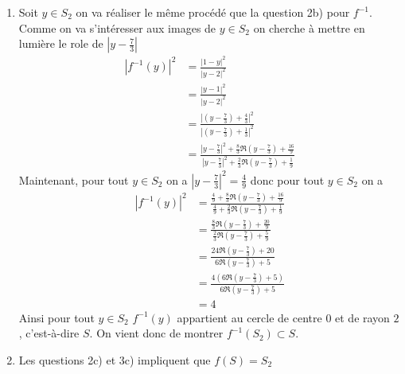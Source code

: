 \begin{correction}
\begin{enumerate}
\begin{enumerate}
\item Soit $y\in S_2$ on va réaliser le même procédé que la question 2b) pour $f^{-1}$. Comme on va s'intéresser aux images de $y \in S_2$ on cherche à mettre en lumière le role de $|y-\frac{7}{3}|$
\begin{align*}
\left|f^{-1} (y) \right|^2 &=\frac{|1-y|^2}{|y-2|^2}\\
									&=\frac{|y-1|^2 }{|y-2|^2}	\\
									&=\frac{|(y-\frac{7}{3}) +\frac{4}{3}|^2 }{|(y-\frac{7}{3}) +\frac{1}{3}|^2}	\\
									&=\frac{|y-\frac{7}{3}|^2 +\frac{8}{3}\Re( y-\frac{7}{3}) + \frac{16}{9} }{|y-\frac{7}{3}|^2 +\frac{2}{3}\Re( y-\frac{7}{3}) + \frac{1}{9} }
\end{align*}
Maintenant, pour tout $y\in S_2$ on a $|y-\frac{7}{3}|^2 =\frac{4}{9}$ donc pour tout $y\in S_2$ on a 
\begin{align*}
\left|f^{-1} (y) \right|^2& = 
\frac{\frac{4}{9}+\frac{8}{3}\Re( y-\frac{7}{3}) + \frac{16}{9} }{\frac{4}{9} +\frac{2}{3}\Re( y-\frac{7}{3}) + \frac{1}{9} }\\
& = 
\frac{\frac{8}{3}\Re( y-\frac{7}{3}) + \frac{20}{9} }{\frac{2}{3}\Re( y-\frac{7}{3}) + \frac{5}{9} }\\
& = 
\frac{24\Re( y-\frac{7}{3}) + 20 }{6\Re( y-\frac{7}{3}) + 5 }\\
& = 
\frac{4(6\Re( y-\frac{7}{3}) + 5) }{6\Re( y-\frac{7}{3}) + 5 }\\
&=4
\end{align*}
Ainsi  pour tout $y\in S_2$  $f^{-1}(y)$ appartient au cercle de centre $0$ et de rayon $2$, c'est-à-dire $S$. 
On vient donc de montrer $f^{-1} (S_2)\subset S$. 
\item Les questions 2c) et 3c) impliquent que $f(S) =S_2$
\end{enumerate}
\end{enumerate}
\end{correction}